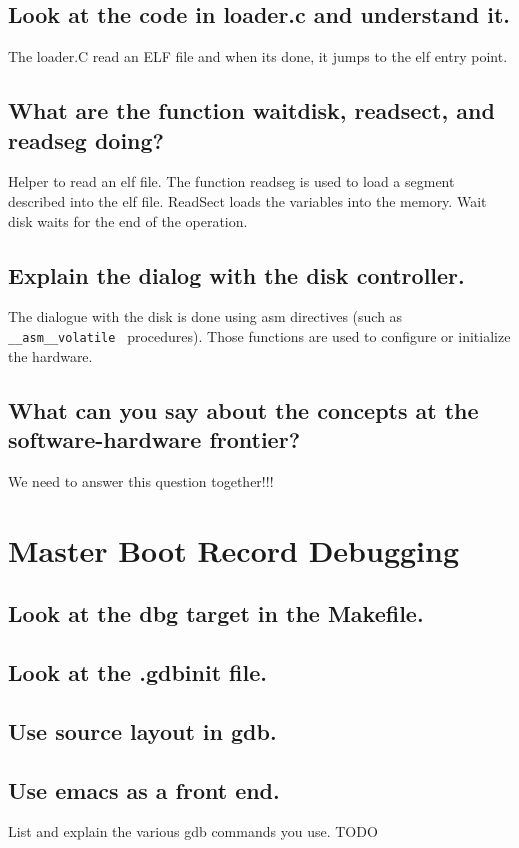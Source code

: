 \documentclass[10]{article}
\begin{document}
\subsection{Look at the code in loader.c and understand it.}
The loader.C read an ELF file and when its done, it jumps to the elf entry point.
\subsection{What are the function waitdisk, readsect, and readseg doing?}
Helper to read an elf file. The function readseg is used to load a segment described into the elf file. ReadSect loads the variables into the memory.
Wait disk waits for the end of the operation.
\subsection{Explain the dialog with the disk controller.}
The dialogue with the disk is done using asm directives (such as \texttt{ \_\_asm\_\_volatile } procedures).
Those functions are used to configure or initialize the hardware.
\subsection{What can you say about the concepts at the software-hardware frontier?}

We need to answer this question together!!!

\section{Master Boot Record Debugging}

\subsection{Look at the dbg target in the Makefile.}
\subsection{Look at the .gdbinit file.}
\subsection{Use source layout in gdb.}
\subsection{Use emacs as a front end.}

List and explain the various gdb commands you use.
TODO
\end{document}
